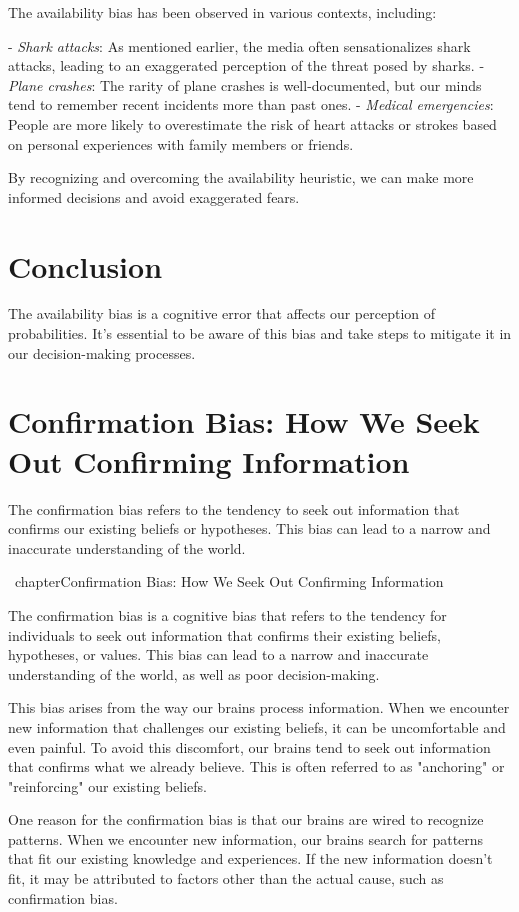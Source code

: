 \documentclass{report}%
\begin{document}
{{{{{{{{{{{The availability bias has been observed in various contexts, including:

- \emph{Shark attacks}: As mentioned earlier, the media often sensationalizes shark attacks, leading to an exaggerated perception of the threat posed by sharks.
- \emph{Plane crashes}: The rarity of plane crashes is well-documented, but our minds tend to remember recent incidents more than past ones.
- \emph{Medical emergencies}: People are more likely to overestimate the risk of heart attacks or strokes based on personal experiences with family members or friends.

By recognizing and overcoming the availability heuristic, we can make more informed decisions and avoid exaggerated fears.

\section{Conclusion}

The availability bias is a cognitive error that affects our perception of probabilities. It's essential to be aware of this bias and take steps to mitigate it in our decision-making processes.
%
\section{Confirmation Bias: How We Seek Out Confirming Information}%
The confirmation bias refers to the tendency to seek out information that confirms our existing beliefs or hypotheses. This bias can lead to a narrow and inaccurate understanding of the world.

%
\ chapter{Confirmation Bias: How We Seek Out Confirming Information}

The confirmation bias is a cognitive bias that refers to the tendency for individuals to seek out information that confirms their existing beliefs, hypotheses, or values. This bias can lead to a narrow and inaccurate understanding of the world, as well as poor decision-making.

This bias arises from the way our brains process information. When we encounter new information that challenges our existing beliefs, it can be uncomfortable and even painful. To avoid this discomfort, our brains tend to seek out information that confirms what we already believe. This is often referred to as "anchoring" or "reinforcing" our existing beliefs.

One reason for the confirmation bias is that our brains are wired to recognize patterns. When we encounter new information, our brains search for patterns that fit our existing knowledge and experiences. If the new information doesn't fit, it may be attributed to factors other than the actual cause, such as confirmation bias.

}}}}}}}}}}}
\end{document}
